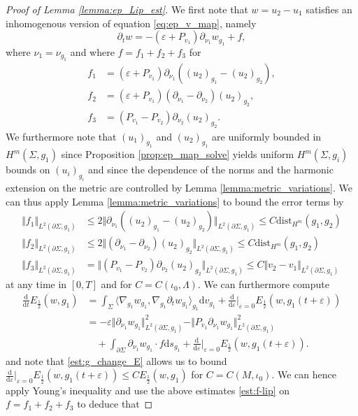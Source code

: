 \documentclass[10pt,reqno]{amsart}
\theoremstyle{plain}
\theoremstyle{definition}
\numberwithin{equation}{section}
\newcommand{\La}{\Lambda}
\newcommand{\Si}{\Sigma}
\newcommand{\ep}{\varepsilon}
\newcommand{\norm}[1]{\Vert#1\Vert}
\newcommand{\beqa}{\begin{equation}\begin{aligned}}
\newcommand{\eeqa}{\end{aligned}\end{equation}}
\newcommand{\dd}{\mathrm{d}} %
\newcommand{\eps}{\varepsilon}
\newcommand{\dist}{\text{dist}}
\newcommand{\hf}{\frac{1}{2}} %
\newcommand{\p}{\partial} %
\newcommand{\inner}[2]{\langle #1, #2\rangle} %
\begin{document}
\begin{proof}[Proof of Lemma \ref{lemma:ep_Lip_est}]
    We first note that $w = u_2-u_1$ satisfies an inhomogenous version of equation \eqref{eq:ep_v_map}, namely 
    \begin{equation}
    	\p_t w = -(\ep + P_{v_1})\p_{\nu_1}w_{g_1} + f,
    \end{equation}
    where $\nu_1=\nu_{g_1}$ and where $f = f_1 + f_2 + f_3$ for
    \begin{align*}
    	f_1 &= (\ep + P_{v_1})\p_{\nu_1}\left((u_2)_{g_1} - (u_2)_{g_2}\right),\\
    	f_2 &= (\ep + P_{v_1})\left(\p_{\nu_1} - \p_{\nu_2}\right)(u_2)_{g_2},\\
    	f_3 &= \left(P_{v_1} - P_{v_2}\right)\p_{\nu_2}(u_2)_{g_2}.
    \end{align*}
    We furthermore note that $(u_1)_{g_1}$ and $(u_2)_{g_1}$ are uniformly bounded in $H^m(\Si,g_1)$ since Proposition \ref{prop:ep_map_solve} yields uniform $H^m(\Si,g_i)$ bounds on $(u_i)_{g_i}$ and since the dependence of the norms and the harmonic extension on the metric are controlled by Lemma \ref{lemma:metric_variations}. We can thus apply Lemma \ref{lemma:metric_variations} to bound the error terms by 
    \beqa\label{est:f-lip}
        \norm{f_1}_{L^2(\p\Si,g_1)}&\le 2\norm{\p_{\nu_1}\left((u_2)_{g_1}-(u_2)_{g_2}\right)}_{L^2(\p\Si,g_1)} \le C\dist_{H^{m}}(g_1,g_2)\\
        \norm{f_2}_{L^2(\p\Si,g_1)}&\le 2\norm{\left(\p_{\nu_1}-\p_{\nu_2}\right)(u_2)_{g_2}}_{L^2(\p\Si,g_1)} \le C\dist_{H^{m}}(g_1,g_2)\\
        \norm{f_3}_{L^2(\p\Si,g_1)} &= \norm{\left(P_{v_1}-P_{v_2}\right)\p_{\nu_2}(u_2)_{g_2}}_{L^2(\p\Si,g_1)} \le C\norm{v_2-v_1}_{L^2(\p\Si,g_1)}
    \eeqa
    at any time in $[0,T]$ and for $C=C(\iota_0,\La)$. We can furthermore compute
    \beqa\label{est:ddE-w}
        \tfrac{\dd}{\dd t}E_{\hf}(w,g_1) &=\int_{\Si}\inner{\nabla_{g_1}w_{g_1}}{\nabla_{g_1}\p_tw_{g_1}}_{g_1}\dd v_{g_1}
        +\tfrac{\dd}{\dd \ep}\big|_{\eps=0} E_{\hf}(w,g_1(t+\ep))\\
        &=-\ep\norm{\p_{\nu_1}w_{g_1}}_{L^2(\p\Si,g_1)}^2-\norm{P_{v_1}\p_{\nu_1}w_{g_1}}_{L^2(\p\Si,g_1)}^2\\
        &\quad+\int_{\p\Si}\p_{\nu_1}w_{g_1}\cdot f\dd s_{g_1}+\tfrac{\dd}{\dd \ep}\big|_{\eps=0} E_{\hf}(w,g_1(t+\ep)). 
    \eeqa
    and note that \eqref{est:g_change_E} allows us to bound $\frac{\dd}{\dd \ep}\big|_{\eps=0} E_{\hf}(w,g_1(t+\ep)) \le CE_{\hf}(w,g_1)$ for $C=C(M,\iota_0)$. We can hence apply Young's inequality and use the above estimates \eqref{est:f-lip} on $f=f_1+f_2+f_3$ to deduce that  

\end{proof}
\end{document}
